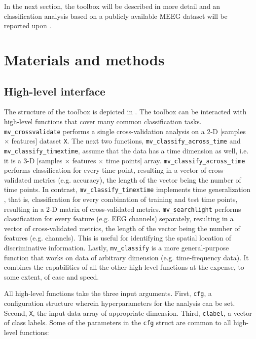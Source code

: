 \documentclass[utf8]{frontiersSCNS} %
\newcommand{\ttt}[1]{\texttt{#1}}
\begin{document}
In the next section, the toolbox will be described in more detail and an classification analysis based on a publicly available MEEG dataset will be reported upon \citep{Wakeman2015ADataset,Wakeman2014OpenfMRI}.

\section{Materials and methods}

\subsection{High-level interface}

The structure of the toolbox is depicted in . 
The toolbox can be interacted with high-level functions that cover many common classification tasks. \ttt{mv\_crossvalidate} performs a single cross-validation analysis on a 2-D [samples $\times$ features] dataset \ttt{X}. The next two functions, \ttt{mv\_classify\_across\_time}  and \ttt{mv\_classify\_timextime}, assume that the data has a time dimension as well, i.e. it is a 3-D [samples $\times$ features $\times$ time points] array. \ttt{mv\_classify\_across\_time} performs classification for every time point, resulting in a vector of cross-validated metrics (e.g. accuracy), the length of the vector being the number of time points. In contrast, \ttt{mv\_classify\_timextime} implements time generalization \citep{King2014}, that is, classification for every combination of training and test time points, resulting in a 2-D matrix of cross-validated metrics. \ttt{mv\_searchlight}  performs classification for every feature (e.g. EEG channels) separately, resulting in a vector of cross-validated metrics, the length of the vector being the number of features (e.g. channels). This is useful for identifying the spatial location of discriminative information. Lastly, \ttt{mv\_classify} is a more general-purpose function that works on data of arbitrary dimension (e.g. time-frequency data). It combines the capabilities of all the other high-level functions at the expense, to some extent, of ease and speed.

All high-level functions take the three input arguments. First, \ttt{cfg}, a configuration structure wherein hyperparameters for the analysis can be set. Second, \ttt{X}, the input data array of appropriate dimension. Third, \ttt{clabel}, a vector of class labels.
Some of the parameters in the \ttt{cfg} struct are common  to all high-level functions:
\end{document}
